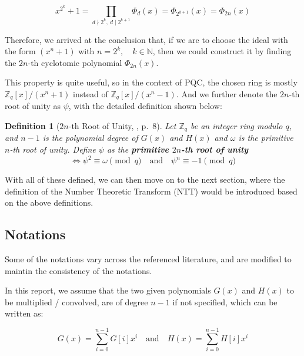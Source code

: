 \documentclass[12pt]{article}
\newtheorem{definition}{Definition}[section]
\begin{document}
\begin{equation*}
    x^{2^k} + 1 
    = \prod_{d \nmid 2^k, \ d \mid 2^{k+1}} \Phi_d(x)
    = \Phi_{2^{k+1}}(x)
    = \Phi_{2n}(x)
\end{equation*}

Therefore, we arrived at the conclusion that, 
if we are to choose the ideal with the form $(x^n + 1)$ with $n = 2^k, \quad k \in \mathbb{N}$, 
then we could construct it by finding the $2n$-th cyclotomic polynomial $\Phi_{2n}(x)$.

This property is quite useful, so in the context of PQC, 
the chosen ring is mostly $\mathbb{Z}_q[x] / (x^n + 1)$ instead of $\mathbb{Z}_q[x] / (x^n - 1)$.
\cite[p.~8]{beginner_guide} 
And we further denote the $2n$-th root of unity as $\psi$, 
with the detailed definition shown below:

\begin{definition}[$2n$-th Root of Unity, \cite{beginner_guide}, p.~8]
    Let $\mathbb{Z}_q$ be an integer ring modulo $q$, and $n - 1$ is the polynomial degree of $G(x)$ and $H(x)$
    and $\omega$ is the primitive $n$-th root of unity. 
    Define $\psi$ as the \textbf{primitive $2n$-th root of unity} 
    \begin{equation*}
        \iff \psi^2 \equiv \omega \pmod{q} \quad \text{and} \quad \psi^n \equiv -1 \pmod{q}
    \end{equation*}
\end{definition}

With all of these defined, we can then move on to the next section, 
where the definition of the Number Theoretic Transform (NTT) would be introduced based on the above definitions.

\subsection{Notations}

Some of the notations vary across the referenced literature, 
and are modified to maintin the consistency of the notations. 

In this report, we assume that the two given polynomials $G(x)$ and $H(x)$ to be multiplied / convolved, 
are of degree $n-1$ if not specified, which can be written as:

\begin{equation*}
    G(x) = \sum_{i = 0}^{n - 1} G[i] x^i \quad \text{and} \quad H(x) = \sum_{i = 0}^{n - 1} H[i] x^i
\end{equation*}
\end{document}
